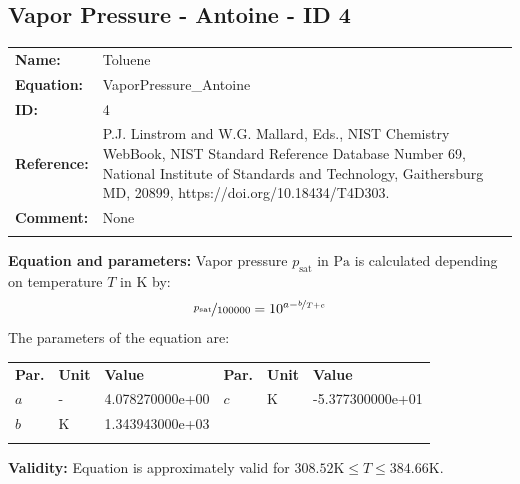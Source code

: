 \FloatBarrier
\newpage
\subsection{Vapor Pressure - Antoine - ID 4}
%
\begin{tabular}[l]{|lp{11.5cm}|}
\hline
\addlinespace

\textbf{Name:} & Toluene \\
\textbf{Equation:} & VaporPressure\_Antoine \\
\textbf{ID:} & 4 \\
\textbf{Reference:} & P.J. Linstrom and W.G. Mallard, Eds., NIST Chemistry WebBook, NIST Standard Reference Database Number 69, National Institute of Standards and Technology, Gaithersburg MD, 20899, https://doi.org/10.18434/T4D303. \\
\textbf{Comment:} & None \\

\addlinespace
\hline
\end{tabular}
\newline

\textbf{Equation and parameters:}
\newline
%
Vapor pressure $p_\mathrm{sat}$ in $\si{\pascal}$ is calculated depending on temperature $T$ in $\si{\kelvin}$ by:
%
\begin{equation*}
\nicefrac{p_\mathrm{sat}}{100000} = 10^{a - \nicefrac{b}{T + c}}
\end{equation*}
%
The parameters of the equation are:
%
\begin{longtable}[l]{lll|lll}
\toprule
\addlinespace
\textbf{Par.} & \textbf{Unit} & \textbf{Value} &	\textbf{Par.} & \textbf{Unit} & \textbf{Value} \\
\addlinespace
\midrule
\endhead

\bottomrule
\endfoot
\bottomrule
\endlastfoot
\addlinespace

$a$ & - & 4.078270000e+00 & $c$ & $\si{\kelvin}$  & -5.377300000e+01 \\
$b$ & $\si{\kelvin}$ & 1.343943000e+03 & & & \\

\addlinespace\end{longtable}

\textbf{Validity:}
\newline
Equation is approximately valid for $308.52 \si{\kelvin} \leq T \leq 384.66 \si{\kelvin}$.
\newline

